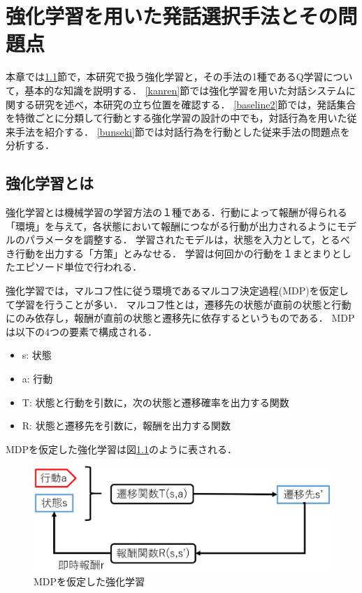 \documentclass[12pt,a4paper,twoside,openany]{jbook}
\begin{document}
\chapter{強化学習を用いた発話選択手法とその問題点}
本章では\ref{kyoka}節で，本研究で扱う強化学習と，その手法の1種であるQ学習について，基本的な知識を説明する．
\ref{kanren}節では強化学習を用いた対話システムに関する研究を述べ，本研究の立ち位置を確認する．
\ref{baseline2}節では，発話集合を特徴ごとに分類して行動とする強化学習の設計の中でも，対話行為を用いた従来手法を紹介する．
\ref{bunseki}節では対話行為を行動とした従来手法の問題点を分析する．

\section{強化学習とは}\label{kyoka}
強化学習とは機械学習の学習方法の１種である．行動によって報酬が得られる「環境」を与えて，各状態において報酬につながる行動が出力されるようにモデルのパラメータを調整する．
学習されたモデルは，状態を入力として，とるべき行動を出力する「方策」とみなせる．
学習は何回かの行動を１まとまりとしたエピソード単位で行われる．

強化学習では，マルコフ性に従う環境であるマルコフ決定過程(MDP)を仮定して学習を行うことが多い．
マルコフ性とは，遷移先の状態が直前の状態と行動にのみ依存し，報酬が直前の状態と遷移先に依存するというものである．
MDPは以下の4つの要素で構成される．
\begin{itemize}
\item s: 状態
\item a: 行動
\item T: 状態と行動を引数に，次の状態と遷移確率を出力する関数
\item R: 状態と遷移先を引数に，報酬を出力する関数
\end{itemize}
MDPを仮定した強化学習は図\ref{MDP}のように表される．
\begin{figure}[ht]
  \begin{center} %
    \includegraphics[width=12cm]{MDP.eps}
    \caption{MDPを仮定した強化学習} %
    \label{MDP} %
  \end{center}
\end{figure}
\end{document}
